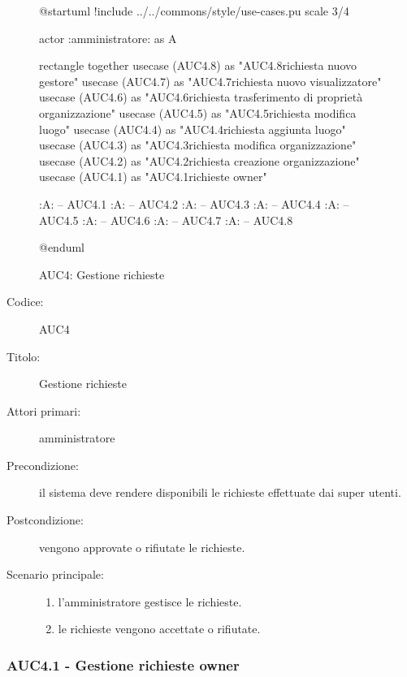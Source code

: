 \documentclass[casi-duso]{subfiles}
\begin{document}
\begin{figure}[h!]
  \centering
  \begin{plantuml}
  @startuml
  !include ../../commons/style/use-cases.pu
  scale 3/4

  actor :amministratore: as A

  rectangle {
    together {
      usecase (AUC4.8) as "AUC4.8\nGestione richiesta nuovo gestore"
      usecase (AUC4.7) as "AUC4.7\nGestione richiesta nuovo visualizzatore"
      usecase (AUC4.6) as "AUC4.6\nGestione richiesta trasferimento di proprietà organizzazione"
      usecase (AUC4.5) as "AUC4.5\nGestione richiesta modifica luogo"
      usecase (AUC4.4) as "AUC4.4\nGestione richiesta aggiunta luogo"
      usecase (AUC4.3) as "AUC4.3\nGestione richiesta modifica organizzazione"
      usecase (AUC4.2) as "AUC4.2\nGestione richiesta creazione organizzazione"
      usecase (AUC4.1) as "AUC4.1\nGestione richieste owner"
    }
  }

  :A: -- AUC4.1
  :A: -- AUC4.2
  :A: -- AUC4.3
  :A: -- AUC4.4
  :A: -- AUC4.5
  :A: -- AUC4.6
  :A: -- AUC4.7
  :A: -- AUC4.8

  @enduml

  \end{plantuml}
  \caption{AUC4: Gestione richieste}
  \label{fig:auc4}
\end{figure}

\begin{description}
  \item[Codice:] AUC4
  \item[Titolo:] Gestione richieste
  \item[Attori primari:] amministratore
  \item[Precondizione:] il sistema deve rendere disponibili le richieste effettuate dai super utenti.
  \item[Postcondizione:] vengono approvate o rifiutate le richieste.
  \item[Scenario principale:]
  \begin{enumerate}
    \item l'amministratore gestisce le richieste.
    \item le richieste vengono accettate o rifiutate.
  \end{enumerate}
\end{description}

\subsubsection{AUC4.1 - Gestione richieste owner}%
\label{subsub:AUC4.1}
\end{document}
